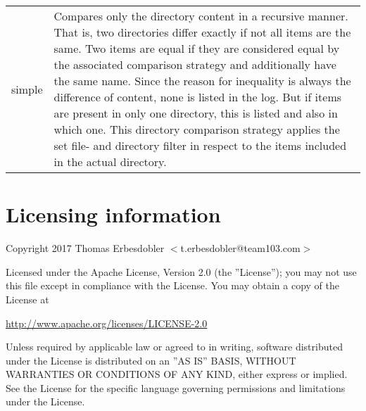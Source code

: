 \documentclass[a4paper]{article}
\begin{document}
	\begin{tabularx}{\linewidth}{lX}
		simple & Compares only the directory content in a recursive manner. That is, two directories differ exactly if not all items are the same. Two items are equal if they are considered equal by the associated comparison strategy and additionally have the same name. Since the reason for inequality is always the difference of content, none is listed in the log. But if items are present in only one directory, this is listed and also in which one. This directory comparison strategy applies the set file- and directory filter in respect to the items included in the actual directory.
	\end{tabularx}
	
	\section{Licensing information}
	\label{sec:licensing_information}
	
	Copyright 2017 Thomas Erbesdobler $<$t.erbesdobler@team103.com$>$
	
	Licensed under the Apache License, Version 2.0 (the ''License'');
	you may not use this file except in compliance with the License.
	You may obtain a copy of the License at
	
	\begin{center}
		\url{http://www.apache.org/licenses/LICENSE-2.0}
	\end{center}
	
	Unless required by applicable law or agreed to in writing, software
	distributed under the License is distributed on an ''AS IS'' BASIS,
	WITHOUT WARRANTIES OR CONDITIONS OF ANY KIND, either express or implied.
	See the License for the specific language governing permissions and
	limitations under the License.
	
\end{document}

